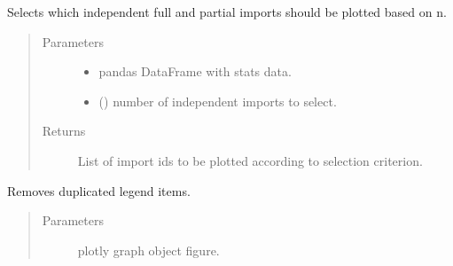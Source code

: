 \documentclass[letterpaper,10pt,english]{sphinxmanual}
\begin{document}

\begin{fulllineitems}
\label{\detokenize{_autosummary/report_manager.apps:report_manager.apps.imports.select_last_n_imports}}
Selects which independent full and partial imports should be plotted based on n.
\begin{quote}\begin{description}
\item[{Parameters}] \leavevmode\begin{itemize}
\item {} 
 \textendash{} pandas DataFrame with stats data.

\item {} 
 () \textendash{} number of independent imports to select.

\end{itemize}

\item[{Returns}] \leavevmode
List of import ids to be plotted according to selection criterion.

\end{description}\end{quote}

\end{fulllineitems}


\begin{fulllineitems}
\label{\detokenize{_autosummary/report_manager.apps:report_manager.apps.imports.remove_legend_duplicates}}
Removes duplicated legend items.
\begin{quote}\begin{description}
\item[{Parameters}] \leavevmode
{} \textendash{} plotly graph object figure.

\end{description}\end{quote}

\end{fulllineitems}
\end{document}
